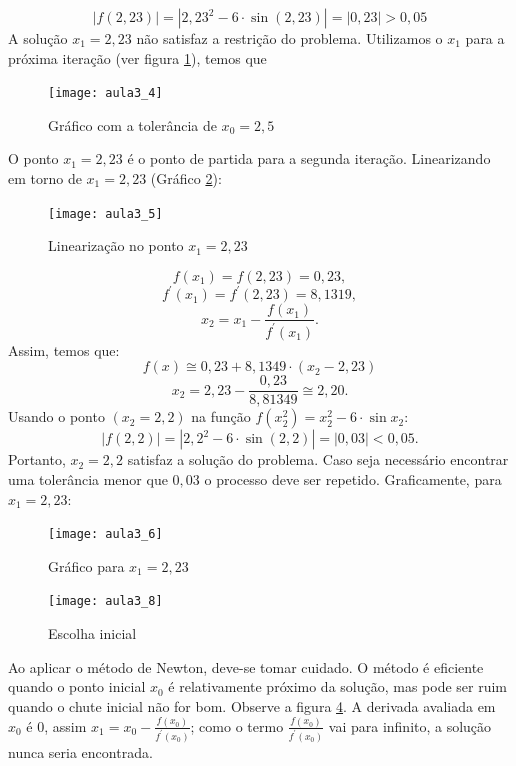 \begin{exemplo}
\[
| f(2,23)|=|2,23^{2}-6\cdot\sin(2,23)|=|0,23|>0,05
\]
A solução $x_{1}=2,23$ não satisfaz a restrição do problema. Utilizamos o $x_1$ para a próxima iteração (ver figura \ref{fig:aula3_4}), temos que 
\begin{figure}[H]
\begin{centering}
\texttt{[image: aula3\_4]}\protect\caption{\label{fig:aula3_4} Gráfico com a tolerância de $x_{0}=2,5$  }
\end{centering}
\end{figure}
O ponto $x_{1}=2,23$ é o ponto de partida para a segunda iteração.
Linearizando em torno de $x_{1}=2,23$ (Gráfico \ref{fig:aula3_5}):
\begin{figure}[H]
\begin{centering}
\texttt{[image: aula3\_5]}\protect\caption{\label{fig:aula3_5} Linearização no ponto $x_{1}=2,23$  }
\end{centering}
\end{figure}
$$f(x_{1})=f(2,23)=0,23,$$
$$f^{'}(x_{1})=f^{'}(2,23)=8,1319,$$
$$x_{2}=x_{1}-\frac{f(x_{1})}{f^{'}(x_{1})}.$$
Assim, temos que:
$$f(x)\cong0,23+8,1349\cdot(x_{2}-2,23)$$
$$x_{2}=2,23 - \frac{0,23}{8,81349} \cong 2,20.$$
Usando o ponto $(x_{2}=2,2)$ na função $f(x_{2}^{2})=x_{2}^{2}-6\cdot\sin x_{2}$:
\[
	|f(2,2)|=|2,2^{2}-6\cdot\sin(2,2)|=|0,03|<0,05.
\]
Portanto, $x_{2}=2,2$ satisfaz a solução do problema. Caso seja necessário
encontrar uma tolerância menor que $0,03$ o processo deve ser repetido.
Graficamente, para $x_{1}=2,23$:
\begin{figure}[H]
\begin{centering}
\texttt{[image: aula3\_6]}\protect\caption{\label{fig:aula3_6} Gráfico para $x_{1}=2,23$  }
\end{centering}
\end{figure}







\begin{figure}[H]
\begin{centering}
\texttt{[image: aula3\_8]}\protect\caption{\label{fig:aula3_8} Escolha inicial  }
\end{centering}
\end{figure}

\end{exemplo}


Ao aplicar o método de Newton, deve-se tomar cuidado. O método é eficiente quando o ponto inicial $x_0$ é relativamente próximo da solução, mas pode ser ruim quando o chute inicial não for bom. Observe a figura \ref{fig:aula3_8}. A derivada avaliada em $x_0$ é 0, assim $x_{1}=x_{0}-\frac{f(x_{0})}{f^{'}(x_{0})}$; como o termo $\frac{f(x_{0})}{f^{'}(x_{0})}$ vai para infinito, a solução nunca seria encontrada. 


